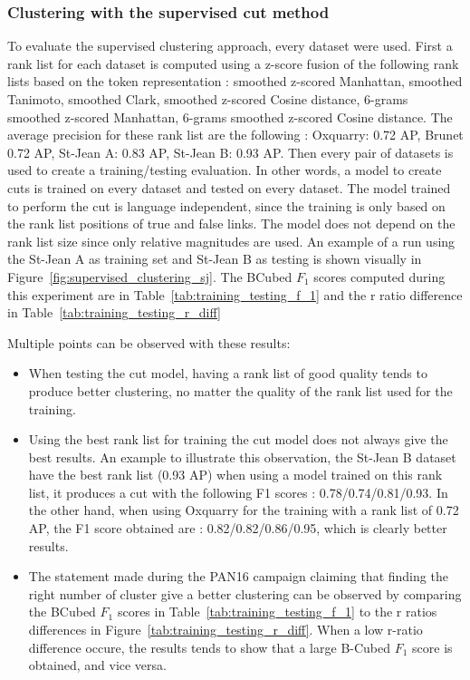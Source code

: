 \subsubsection{Clustering with the supervised cut method}

To evaluate the supervised clustering approach, every dataset were used.
First a rank list for each dataset is computed using a z-score fusion of the following rank lists based on the token representation : smoothed z-scored Manhattan, smoothed Tanimoto, smoothed Clark, smoothed z-scored Cosine distance, 6-grams smoothed z-scored Manhattan, 6-grams smoothed z-scored Cosine distance.
The average precision for these rank list are the following : Oxquarry: 0.72 AP, Brunet 0.72 AP, St-Jean A: 0.83 AP, St-Jean B: 0.93 AP.
Then every pair of datasets is used to create a training/testing evaluation.
In other words, a model to create cuts is trained on every dataset and tested on every dataset.
The model trained to perform the cut is language independent, since the training is only based on the rank list positions of true and false links.
The model does not depend on the rank list size since only relative magnitudes are used.
An example of a run using the St-Jean A as training set and St-Jean B as testing is shown visually in Figure~\ref{fig:supervised_clustering_sj}.
The BCubed $F_1$ scores computed during this experiment are in Table~\ref{tab:training_testing_f_1} and the r ratio difference
in Table~\ref{tab:training_testing_r_diff}

Multiple points can be observed with these results:
\begin{itemize}
  \item
  When testing the cut model, having a rank list of good quality tends to produce better clustering, no matter the quality of the rank list used for the training.
  \item
  Using the best rank list for training the cut model does not always give the best results.
  An example to illustrate this observation, the St-Jean B dataset have the best rank list (0.93 AP) when using a model trained on this rank list, it produces a cut with the following F1 scores : 0.78/0.74/0.81/0.93.
  In the other hand, when using Oxquarry for the training with a rank list of 0.72 AP, the F1 score obtained are : 0.82/0.82/0.86/0.95, which is clearly better results.
  \item
  The statement made during the PAN16 campaign claiming that finding the right number of cluster give a better clustering can be observed by comparing the BCubed $F_1$ scores in Table~\ref{tab:training_testing_f_1} to the r ratios differences in Figure~\ref{tab:training_testing_r_diff}.
  When a low r-ratio difference occure, the results tends to show that a large B-Cubed $F_1$ score is obtained, and vice versa.
\end{itemize}

